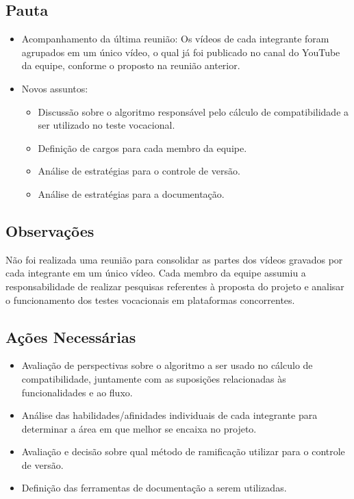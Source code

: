 \begin{apendicesenv}
\subsection*{Pauta}
\begin{itemize}
    \item Acompanhamento da última reunião: Os vídeos de cada integrante foram agrupados em um único vídeo, o qual já foi publicado no canal do YouTube da equipe, conforme o proposto na reunião anterior. 
    \item Novos assuntos:
    \begin{itemize}
        \item Discussão sobre o algoritmo responsável pelo cálculo de compatibilidade a ser utilizado no teste vocacional.
        \item Definição de cargos para cada membro da equipe.
        \item Análise de estratégias para o controle de versão.
        \item Análise de estratégias para a documentação.
    \end{itemize}
\end{itemize}

\subsection*{Observações}
Não foi realizada uma reunião para consolidar as partes dos vídeos gravados por cada integrante em um único vídeo.
Cada membro da equipe assumiu a responsabilidade de realizar pesquisas referentes à proposta do projeto e analisar o funcionamento dos testes vocacionais em plataformas concorrentes.

\subsection*{Ações Necessárias}
\begin{itemize}
    \item Avaliação de perspectivas sobre o algoritmo a ser usado no cálculo de compatibilidade, juntamente com as suposições relacionadas às funcionalidades e ao fluxo.
    \item Análise das habilidades/afinidades individuais de cada integrante para determinar a área em que melhor se encaixa no projeto.
    \item Avaliação e decisão sobre qual método de ramificação utilizar para o controle de versão.
    \item Definição das ferramentas de documentação a serem utilizadas.
\end{itemize}


\end{apendicesenv}
